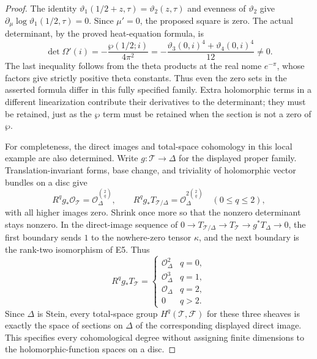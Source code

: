 \begin{proof}
The identity $\vartheta_1(1/2+z,\tau)=\vartheta_2(z,\tau)$
and evenness of $\vartheta_2$ give
$\partial_\mu\log\vartheta_1(1/2,\tau)=0$. Since $\mu'=0$,
the proposed square is zero. The actual determinant, by the
proved heat-equation formula, is
\[
 \det\Omega'(i)=-\frac{\wp(1/2;i)}{4\pi^2}
 =-\frac{\vartheta_3(0,i)^4+\vartheta_4(0,i)^4}{12}\ne0.
\]
The last inequality follows from the theta products at the real
nome $e^{-\pi}$, whose factors give strictly positive theta
constants. Thus even the zero sets in the asserted formula
differ in this fully specified family. Extra holomorphic terms
in a different linearization contribute their derivatives to
the determinant; they must be retained, just as the $\wp$ term
must be retained when the section is not a zero of $\wp$.

For completeness, the direct images and total-space cohomology
in this local example are also determined. Write
$g:\mathscr T\to\Delta$ for the displayed proper family.
Translation-invariant forms, base change, and triviality of
holomorphic vector bundles on a disc give
\[
 R^qg_*\mathcal O_{\mathscr T}
   =\mathcal O_\Delta^{\binom2q},\qquad
 R^qg_*T_{\mathscr T/\Delta}
   =\mathcal O_\Delta^{2\binom2q}\quad(0\leq q\leq2),
\]
with all higher images zero. Shrink once more so that the
nonzero determinant stays nonzero. In the direct-image sequence
of $0\to T_{\mathscr T/\Delta}\to T_{\mathscr T}
\to g^*T_\Delta\to0$, the first boundary sends $1$ to the
nowhere-zero tensor $\kappa$, and the next boundary is the
rank-two isomorphism of E5. Thus
\[
 R^qg_*T_{\mathscr T}=
 \begin{cases}
  \mathcal O_\Delta^2&q=0,\\
  \mathcal O_\Delta^3&q=1,\\
  \mathcal O_\Delta&q=2,\\
  0&q>2.
 \end{cases}
\]
Since $\Delta$ is Stein, every total-space group
$H^q(\mathscr T,\mathcal F)$ for these three sheaves is exactly
the space of sections on $\Delta$ of the corresponding displayed
direct image. This specifies every cohomological degree without
assigning finite dimensions to the holomorphic-function spaces
on a disc.
\end{proof}

